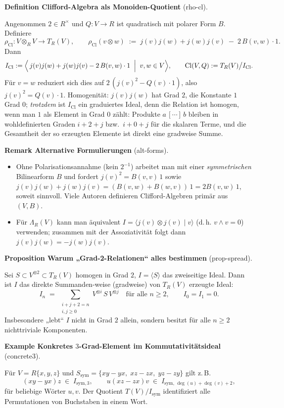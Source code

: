 \documentclass[10pt, letterpaper]{article}
\newcommand{\Cl}{\mathrm{Cl}}
\newcommand{\CustomHeading}[3]{%
  \par\medskip\noindent%
  \textbf{#1 #2} \textnormal{(#3)}.\enskip%
}
\newenvironment{DEF}[2]{\begin{unitbox}\CustomHeading{Definition}{#1}{#2}}{\end{unitbox}}
\newenvironment{PROP}[2]{\begin{unitbox}\CustomHeading{Proposition}{#1}{#2}}{\end{unitbox}}
\newenvironment{REM}[2]{\begin{unitbox}\CustomHeading{Remark}{#1}{#2}}{\end{unitbox}}
\newenvironment{EXA}[2]{\begin{unitbox}\CustomHeading{Example}{#1}{#2}}{\end{unitbox}}
\begin{document}
\begin{DEF}{Clifford-Algebra als Monoiden-Quotient}{rho-cl}
Angenommen $2\in R^\times$ und $Q:V\to R$ ist quadratisch mit polarer Form $B$.
Definiere
\[
\rho_{\mathrm{Cl}}:V\otimes_R V\to T_R(V),\qquad
\rho_{\mathrm{Cl}}(v\otimes w)\;:=\;j(v)j(w)+j(w)j(v)\;-\;2\,B(v,w)\cdot 1.
\]
Dann
\[
I_{\mathrm{Cl}}:=\Big\langle\, j(v)j(w)+j(w)j(v)-2\,B(v,w)\cdot 1 \;\Bigm|\; v,w\in V\Big\rangle,
\qquad
\Cl(V,Q):=T_R(V)\big/I_{\mathrm{Cl}}.
\]
Für $v=w$ reduziert sich dies auf $2\,(j(v)^2-Q(v)\cdot 1)$, also $j(v)^2=Q(v)\cdot 1$.
Homogenität: $j(v)j(w)$ hat Grad $2$, die Konstante $1$ Grad $0$;
\emph{trotzdem} ist $I_{\mathrm{Cl}}$ ein graduiertes Ideal, denn die Relation ist
homogen, wenn man $1$ als Element in Grad $0$ zählt: Produkte $a\,[\cdots]\,b$
bleiben in wohldefinierten Graden $i+2+j$ bzw.\ $i+0+j$ für die skalaren Terme,
und die Gesamtheit der so erzeugten Elemente ist direkt eine gradweise Summe.
\end{DEF}

\begin{REM}{Alternative Formulierungen}{alt-forms}
\begin{itemize}[leftmargin=*]
\item Ohne Polarisationsannahme (kein $2^{-1}$) arbeitet man mit einer \emph{symmetrischen} Bilinearform
$B$ und fordert $j(v)^2=B(v,v)\,1$ sowie $j(v)j(w)+j(w)j(v)=(B(v,w)+B(w,v))\,1=2B(v,w)\,1$,
soweit sinnvoll. Viele Autoren definieren Clifford-Algebren primär aus $(V,B)$.
\item Für $\Lambda_R(V)$ kann man äquivalent $I=\langle j(v)\otimes j(v)\mid v\rangle$ (d.\,h. $v\wedge v=0$)
verwenden; zusammen mit der Assoziativität folgt dann $j(v)j(w)=-j(w)j(v)$.
\end{itemize}
\end{REM}

\begin{PROP}{Warum „Grad-2-Relationen“ alles bestimmen}{prop-spread}
Sei $S\subset V^{\otimes 2}\subset T_R(V)$ homogen in Grad $2$, $I=\langle S\rangle$ das zweiseitige Ideal.
Dann ist $I$ das direkte Summanden-weise (gradweise) von $T_R(V)$ erzeugte Ideal:
\[
I_n \;=\;\sum_{\substack{i+j+2=n\\ i,j\ge 0}} V^{\otimes i}\,S\,V^{\otimes j}
\quad\text{für alle }n\ge 2,\qquad I_0=I_1=0.
\]
Insbesondere „lebt“ $I$ nicht in Grad $2$ allein, sondern besitzt für alle $n\ge 2$ nichttriviale Komponenten.
\end{PROP}

\begin{EXA}{Konkretes $3$-Grad-Element im Kommutativitätsideal}{concrete3}
Für $V=R\{x,y,z\}$ und $S_\mathrm{sym}=\{xy-yx,\;xz-zx,\;yz-zy\}$ gilt z.\,B.
\[
(xy-yx)z \;\in\; I_{\mathrm{sym},3},\qquad
u(xz-zx)v \;\in\; I_{\mathrm{sym},\,\deg(u)+\deg(v)+2},
\]
für beliebige Wörter $u,v$. Der Quotient $T(V)/I_{\mathrm{sym}}$ identifiziert
alle Permutationen von Buchstaben in einem Wort.
\end{EXA}
\end{document}
